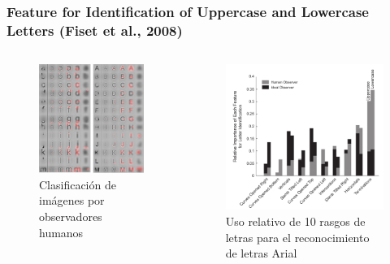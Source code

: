 \documentclass{beamer}
\begin{document}
	\begin{frame}
	\frametitle{Feature for Identification of Uppercase and Lowercase Letters (Fiset et al., 2008)}

	\begin{columns}[t]
	  \begin{figure}
	    \includegraphics[width=.6\textwidth]{graficos/fiset1.png}
	\caption[Fiset et al]{Clasificación de imágenes por observadores humanos}
	  \end{figure}
	  \begin{figure}
	    \includegraphics[width=\textwidth]{graficos/fiset5.png}
	\caption{Uso relativo de 10 rasgos de letras para el reconocimiento de letras Arial}
	  \end{figure}
	\end{columns}

	\end{frame}
\end{document}
